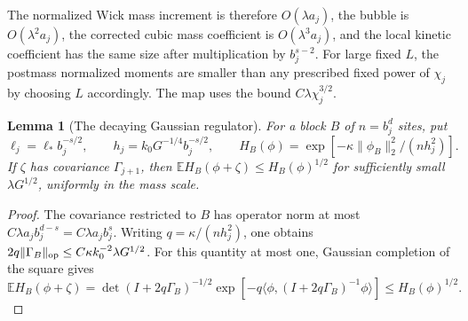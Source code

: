 \documentclass[11pt]{article}
\newtheorem{lemma}[proposition]{Lemma}
\begin{document}
The normalized Wick mass increment is therefore \(O(\lambda a_j)\),
the bubble is \(O(\lambda^2a_j)\), the corrected cubic mass coefficient
is \(O(\lambda^3a_j)\), and the local kinetic coefficient has the same
size after multiplication by \(b_j^{s-2}\). For large fixed \(L\),
the postmass normalized moments are smaller than any prescribed fixed
power of \(\chi_j\) by choosing \(L\) accordingly. The map
uses the bound \(C\lambda\chi_j^{3/2}\).

\begin{lemma}[The decaying Gaussian regulator]
\label{completion:H}
For a block \(B\) of \(n=b_j^d\) sites, put
\[
 \ell_j=\ell_*b_j^{-s/2},\qquad
 h_j=k_0G^{-1/4}b_j^{-s/2},\qquad
 H_B(\phi)=\exp[-\kappa\|\phi_B\|_2^2/(nh_j^2)].
\]
If \(\zeta\) has covariance \(\Gamma_{j+1}\), then
\(\mathbb EH_B(\phi+\zeta)\le H_B(\phi)^{1/2}\) for sufficiently
small \(\lambda G^{1/2}\), uniformly in the mass scale.
\end{lemma}
\begin{proof}
The covariance restricted to \(B\) has operator norm at most
\(C\lambda a_j b_j^{d-s}=C\lambda a_jb_j^s\).
Writing \(q=\kappa/(nh_j^2)\), one obtains
\(2q\|\Gamma_B\|_{\rm op}\le C\kappa k_0^{-2}\lambda G^{1/2}\).
For this quantity at most one, Gaussian completion of the square gives
\[
 \mathbb EH_B(\phi+\zeta)
 =\det(I+2q\Gamma_B)^{-1/2}
 \exp[-q\langle\phi,(I+2q\Gamma_B)^{-1}\phi\rangle]
 \le H_B(\phi)^{1/2}.
\]
\end{proof}
\end{document}

